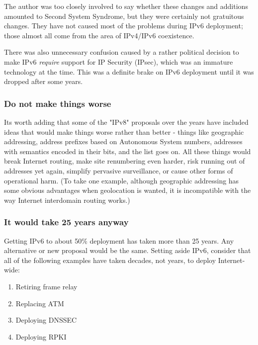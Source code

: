 \documentclass[
]{article}
\providecommand{\tightlist}{%
  \setlength{\itemsep}{0pt}\setlength{\parskip}{0pt}}
\begin{document}
The author was too closely involved to say whether these changes and
additions amounted to Second System Syndrome, but they were certainly
not gratuitous changes. They have not caused most of the problems during
IPv6 deployment; those almost all come from the area of IPv4/IPv6
coexistence.

There was also unnecessary confusion caused by a rather political
decision to make IPv6 \emph{require} support for IP Security (IPsec),
which was an immature technology at the time. This was a definite brake
on IPv6 deployment until it was dropped after some years.

\subsubsection{Do not make things worse}\label{do-not-make-things-worse}

It\textquotesingle s worth adding that some of the "IPv8" proposals over
the years have included ideas that would make things worse rather than
better - things like geographic addressing, address prefixes based on
Autonomous System numbers, addresses with semantics encoded in their
bits, and the list goes on. All these things would break Internet
routing, make site renumbering even harder, risk running out of
addresses yet again, simplify pervasive surveillance, or cause other
forms of operational harm. (To take one example, although geographic
addressing has some obvious advantages when geolocation is wanted, it is
incompatible with the way Internet interdomain routing works.)

\subsubsection{It would take 25 years
anyway}\label{it-would-take-25-years-anyway}

Getting IPv6 to about 50\% deployment has taken more than 25 years. Any
alternative or new proposal would be the same. Setting aside IPv6,
consider that all of the following examples have taken decades, not
years, to deploy Internet-wide:

\begin{enumerate}
\def\labelenumi{\arabic{enumi}.}
\tightlist
\item
  Retiring frame relay
\item
  Replacing ATM
\item
  Deploying DNSSEC
\item
  Deploying RPKI
\end{enumerate}
\end{document}
